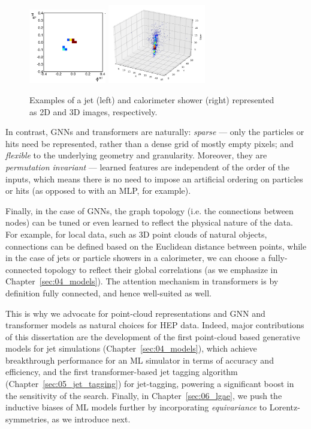 \begin{figure}
    \centering
    \includegraphics[width=0.3\textwidth]{figures/03-ML/jetimage.png}
    \hspace{0.1\textwidth}
    \includegraphics[width=0.38\textwidth]{figures/03-ML/caloimage}
    \caption{Examples of a jet (left) and calorimeter shower (right) represented as 2D and 3D images, respectively.}
    \label{fig:03_ml_jetshowerimage}
\end{figure}

In contrast, GNNs and transformers are naturally: \textit{sparse} --- only the particles or hits need be represented, rather than a dense grid of mostly empty pixels; and \textit{flexible} to the underlying geometry and granularity.
Moreover, they are \textit{permutation invariant} --- learned features are independent of the order of the inputs, which means there is no need to impose an artificial ordering on particles or hits (as opposed to with an MLP, for example).

Finally, in the case of GNNs, the graph topology (i.e. the connections between nodes) can be tuned or even learned to reflect the physical nature of the data.
For example, for local data, such as 3D point clouds of natural objects, connections can be defined based on the Euclidean distance between points, while in the case of jets or particle showers in a calorimeter, we can choose a fully-connected topology to reflect their global correlations (as we emphasize in Chapter~\ref{sec:04_models}).
The attention mechanism in transformers is by definition fully connected, and hence well-suited as well.

This is why we advocate for point-cloud representations and GNN and transformer models as natural choices for HEP data.
Indeed, major contributions of this dissertation are the development of the first point-cloud based generative models for jet simulations (Chapter~\ref{sec:04_models}), which achieve breakthrough performance for an ML simulator in terms of accuracy and efficiency, and the first transformer-based jet tagging algorithm (Chapter~\ref{sec:05_jet_tagging}) for \HVV jet-tagging, powering a significant boost in the sensitivity of the \HH search.
Finally, in Chapter~\ref{sec:06_lgae}, we push the inductive biases of ML models further by incorporating \textit{equivariance} to Lorentz-symmetries, as we introduce next.

